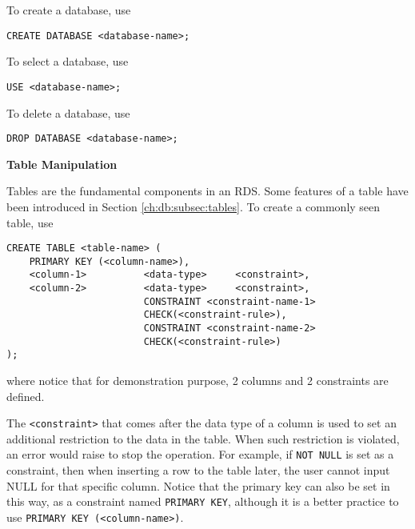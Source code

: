 To create a database, use
\begin{lstlisting}
CREATE DATABASE <database-name>;
\end{lstlisting}

To select a database, use
\begin{lstlisting}
USE <database-name>;
\end{lstlisting}

To delete a database, use
\begin{lstlisting}
DROP DATABASE <database-name>;
\end{lstlisting}

\vspace{0.1in}
\noindent \textbf{Table Manipulation}
\vspace{0.1in}

Tables are the fundamental components in an RDS. Some features of a table have been introduced in Section \ref{ch:db:subsec:tables}. To create a commonly seen table, use
\begin{lstlisting}
CREATE TABLE <table-name> (
    PRIMARY KEY (<column-name>),
    <column-1>          <data-type>     <constraint>,
    <column-2>          <data-type>     <constraint>,
                        CONSTRAINT <constraint-name-1>
                        CHECK(<constraint-rule>),
                        CONSTRAINT <constraint-name-2>
                        CHECK(<constraint-rule>)
);
\end{lstlisting}
where notice that for demonstration purpose, 2 columns and 2 constraints are defined.

The \verb|<constraint>| that comes after the data type of a column is used to set an additional restriction to the data in the table. When such restriction is violated, an error would raise to stop the operation. For example, if \verb|NOT NULL| is set as a constraint, then when inserting a row to the table later, the user cannot input NULL for that specific column. Notice that the primary key can also be set in this way, as a constraint named \verb|PRIMARY KEY|, although it is a better practice to use \verb|PRIMARY KEY (<column-name>)|.

